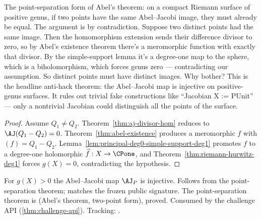 \begin{layman}
The point-separation form of Abel's theorem: on a compact Riemann
surface of positive genus, if two points have the same Abel--Jacobi
image, they must already be equal. The argument is by contradiction.
Suppose two distinct points had the same image. Then the homomorphism
extension sends their difference divisor to zero, so by Abel's
existence theorem there's a meromorphic function with exactly that
divisor. By the simple-support lemma it's a degree-one map to the
sphere, which is a biholomorphism, which forces genus zero ---
contradicting our assumption. So distinct points must have distinct
images. Why bother? This is the headline anti-hack theorem: the
Abel--Jacobi map is injective on positive-genus surfaces. It rules out
trivial fake constructions like ``Jacobian X := PUnit'' --- only a
nontrivial Jacobian could distinguish all the points of the
surface.
\end{layman}

\begin{proof}
Assume \(Q_1\ne Q_2\). Theorem~\ref{thm:aj-divisor-hom} reduces to
\(\AJ(Q_1-Q_2)=0\). Theorem~\ref{thm:abel-existence} produces a
meromorphic \(f\) with \((f)=Q_1-Q_2\).
Lemma~\ref{lem:principal-deg0-simple-support-deg1} promotes \(f\) to a
degree-one holomorphic \(\widehat f:X\to\CPone\), and
Theorem~\ref{thm:riemann-hurwitz-deg1} forces \(g(X)=0\), contradicting
the hypothesis.
\end{proof}

\begin{lemma}
\label{lem:analytic-of-curve-injective}
For \(g(X)>0\) the Abel--Jacobi map \(\AJ_P\) is injective. Follows from the
point-separation theorem; matches the frozen public 
signature. The point-separation theorem is
 (Abel's theorem, two-point form), proved.
Consumed by the challenge API (\ref{thm:challenge-api}).
Tracking: .
\leanok
\end{lemma}

